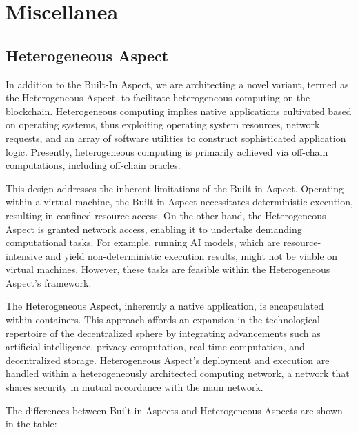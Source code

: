\section{Miscellanea}

\subsection{Heterogeneous Aspect}

In addition to the Built-In Aspect, we are architecting a novel variant, termed as the Heterogeneous Aspect, to facilitate heterogeneous computing on the blockchain. Heterogeneous computing implies native applications cultivated based on operating systems, thus exploiting operating system resources, network requests, and an array of software utilities to construct sophisticated application logic. Presently, heterogeneous computing is primarily achieved via off-chain computations, including off-chain oracles.

This design addresses the inherent limitations of the Built-in Aspect. Operating within a virtual machine, the Built-in Aspect necessitates deterministic execution, resulting in confined resource access. On the other hand, the Heterogeneous Aspect is granted network access, enabling it to undertake demanding computational tasks. For example, running AI models, which are resource-intensive and yield non-deterministic execution results, might not be viable on virtual machines. However, these tasks are feasible within the Heterogeneous Aspect's framework.

The Heterogeneous Aspect, inherently a native application, is encapsulated within containers. This approach affords an expansion in the technological repertoire of the decentralized sphere by integrating advancements such as artificial intelligence, privacy computation, real-time computation, and decentralized storage. Heterogeneous Aspect's deployment and execution are handled within a heterogeneously architected computing network, a network that shares security in mutual accordance with the main network.

The differences between Built-in Aspects and Heterogeneous Aspects are shown in the table:

